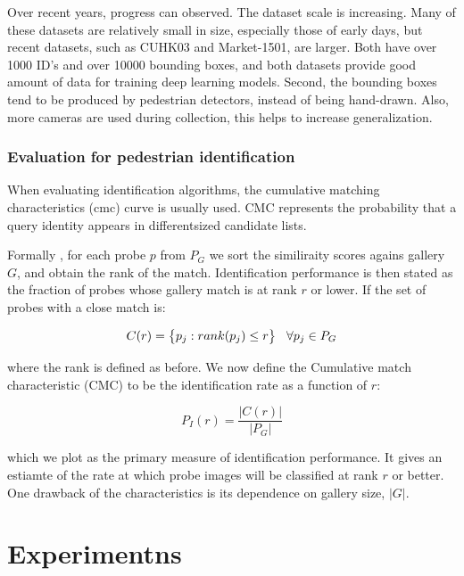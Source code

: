 \documentclass[12pt, a4paper, titlepage,twoside,openright]{article}
\newcommand\abs[1]{\left|#1\right|}
\begin{document}
Over recent years, progress can observed. The dataset scale is increasing. Many of these datasets are relatively small in size, especially those of early days, but recent datasets, such as CUHK03 and Market-1501, are larger. Both have over 1000 ID's and over 10000 bounding boxes, and both datasets provide good amount of data for training deep learning models. Second, the bounding boxes tend to be produced by pedestrian detectors, instead of being hand-drawn. Also, more cameras are used during collection, this helps to increase generalization.

\subsubsection{Evaluation for pedestrian identification}


When evaluating identification algorithms, the cumulative matching characteristics (cmc) curve is usually used. CMC represents the probability that a query identity appears in differentsized candidate lists.

Formally \cite{faceCMC}, for each probe $p$ from $P_{G}$ we sort the similiraity scores agains gallery $G$, and obtain the rank of the match. Identification performance is then stated as the fraction of probes whose gallery match is at rank $r$  or lower. If the set of probes with a close match is:

$$ C(r) = \big\{ p_{j}: rank(p_{j}) \leq r  \bigr\} \hspace{0.3cm} \forall p_{j} \in P_{G}  $$

where the rank is defined as before. We now define the Cumulative match characteristic (CMC) to be the identification rate as a function of $r$:

$$ P_{I}(r) = \dfrac{\abs{C(r)}}{\abs{P_{G}}} $$

which we plot as the primary measure of identification performance. It gives an estiamte of the rate at which probe images will be classified at rank $r$ or better. One drawback of the characteristics is its dependence on gallery size, $\abs{G}$.



\section{Experimentns}
\end{document}
